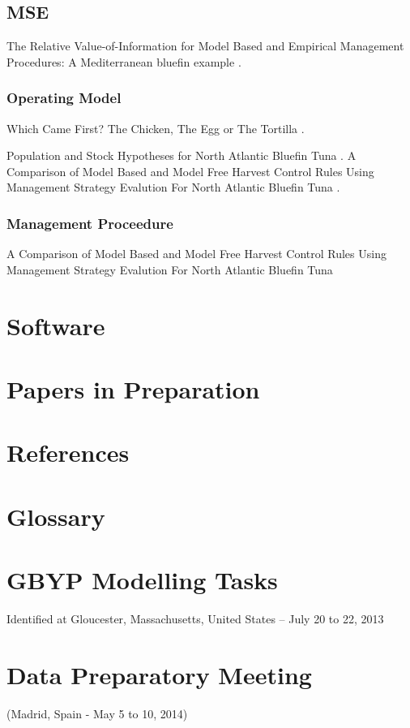 \documentclass[a4paper,10pt]{article}
\begin{document}
\subsection{MSE}

The Relative Value-of-Information for Model Based and Empirical Management Procedures:  A Mediterranean bluefin example 
. 


\subsubsection{Operating Model}

Which Came First? The Chicken, The Egg or The Tortilla .

Population and Stock Hypotheses for North Atlantic Bluefin Tuna .
A Comparison of Model Based and Model Free Harvest Control Rules Using Management Strategy Evalution For North Atlantic Bluefin Tuna 
.

 
\subsubsection{Management Proceedure}

A Comparison of Model Based and Model Free Harvest Control Rules Using Management Strategy Evalution For North Atlantic Bluefin Tuna

\newpage\clearpage
\section{Software}

\section{Papers in Preparation}


\newpage\clearpage
\section{References}



\section{Glossary}
\newpage\printglossaries


\newpage
\section{GBYP Modelling Tasks}
Identified at Gloucester, Massachusetts, United States – July 20 to 22, 2013



\newpage
\section{Data Preparatory Meeting} 
(Madrid, Spain - May 5 to 10, 2014)


\end{document}
